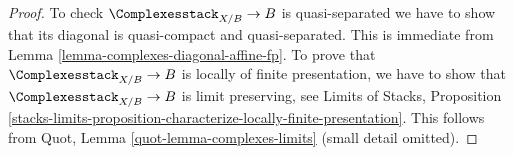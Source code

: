 \begin{proof}
To check $\Complexesstack_{X/B} \to B$ is quasi-separated we have to
show that its diagonal is quasi-compact and quasi-separated.
This is immediate from Lemma \ref{lemma-complexes-diagonal-affine-fp}.
To prove that $\Complexesstack_{X/B} \to B$ is locally of finite
presentation, we have to show that $\Complexesstack_{X/B} \to B$
is limit preserving, see
Limits of Stacks, Proposition
\ref{stacks-limits-proposition-characterize-locally-finite-presentation}.
This follows from Quot, Lemma \ref{quot-lemma-complexes-limits}
(small detail omitted).
\end{proof}











